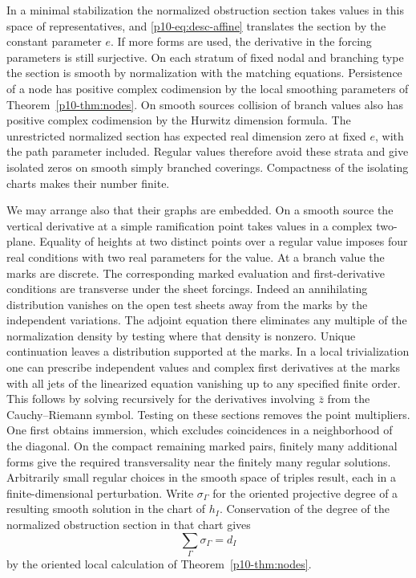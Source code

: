 In a minimal stabilization the normalized obstruction section takes
values in this space of representatives, and \eqref{p10-eq:desc-affine}
translates the section by the constant parameter $e$. If more forms
are used, the derivative in the forcing parameters is still
surjective. On each stratum of fixed nodal and branching type the
section is smooth by normalization with the matching equations.
Persistence of a node has positive complex codimension by the local
smoothing parameters of Theorem~\ref{p10-thm:nodes}. On smooth sources
collision of branch values also has positive complex codimension by
the Hurwitz dimension formula. The unrestricted normalized section
has expected real dimension zero at fixed $e$, with the path
parameter included. Regular values therefore avoid these strata and
give isolated zeros on smooth simply branched coverings. Compactness
of the isolating charts makes their number finite.

We may arrange also that their graphs are embedded. On a smooth
source the vertical derivative at a simple ramification point takes
values in a complex two-plane. Equality of heights at two distinct
points over a regular value imposes four real conditions with two
real parameters for the value. At a branch value the marks are
discrete. The corresponding marked evaluation and first-derivative
conditions are transverse under the sheet forcings. Indeed an
annihilating distribution vanishes on the open test sheets away
from the marks by the independent variations. The adjoint equation
there eliminates any multiple of the normalization density by testing
where that density is nonzero. Unique continuation leaves a
distribution supported at the marks. In a local trivialization one
can prescribe independent values and complex first derivatives at
the marks with all jets of the linearized equation vanishing up to
any specified finite order. This follows by solving recursively for
the derivatives involving $\bar z$ from the Cauchy--Riemann symbol.
Testing on these sections removes the point multipliers. One first
obtains immersion, which excludes coincidences in a neighborhood
of the diagonal. On the compact remaining marked pairs, finitely many
additional forms give the required transversality near the finitely
many regular solutions. Arbitrarily small regular choices in the
smooth space of triples result, each in a finite-dimensional
perturbation. Write $\sigma_\Gamma$ for the oriented projective
degree of a resulting smooth solution in the chart of $h_I$.
Conservation of the degree of the normalized obstruction section in
that chart gives
\begin{equation}\label{p10-eq:desc-sum}
                        \sum_\Gamma\sigma_\Gamma=d_I
\end{equation}
by the oriented local calculation of Theorem~\ref{p10-thm:nodes}.

